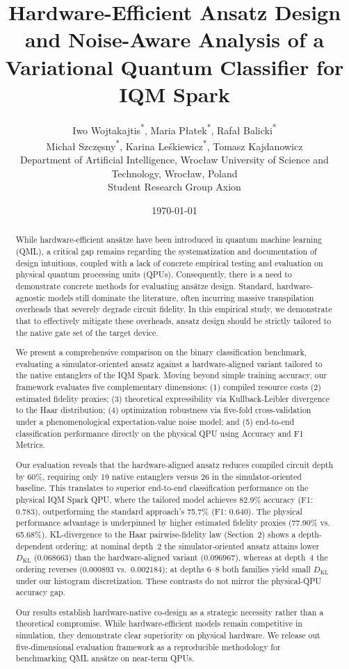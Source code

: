 \documentclass[11pt]{article}
\title{Hardware-Efficient Ansatz Design and Noise-Aware Analysis of a Variational Quantum Classifier for IQM Spark}
\author{
\begin{tabular}{c}
Iwo Wojtakajtis\textsuperscript{*}, Maria P{\l}atek\textsuperscript{*}, Rafa{\l} Balicki\textsuperscript{*}\\
Micha{\l} Szcz{\k{e}}sny\textsuperscript{*}, Karina Le{\'s}kiewicz\textsuperscript{*}, Tomasz Kajdanowicz\\[0.5em]
\small Department of Artificial Intelligence, Wroc{\l}aw University of Science and Technology, Wroc{\l}aw, Poland\\
\small Student Research Group Axion
\end{tabular}
}
\date{\today}
\begin{document}
\maketitle

\begin{abstract}
While hardware-efficient ansätze have been introduced in quantum machine learning (QML), a critical gap remains regarding the systematization and documentation of design intuitions, coupled with a lack of concrete empirical testing and evaluation on physical quantum processing units (QPUs). Consequently, there is a need to demonstrate concrete methods for evaluating  ansätze design. Standard, hardware-agnostic models still dominate the literature, often incurring massive transpilation overheads that severely degrade circuit fidelity. In this empirical study, we demonstrate that to effectively mitigate these overheads, ansatz design should be strictly tailored to the native gate set of the target device.

We present a comprehensive comparison on the binary classification benchmark, evaluating a simulator-oriented ansatz against a hardware-aligned variant tailored to the native entanglers of the IQM Spark. Moving beyond simple training accuracy, our framework evaluates five complementary dimensions: (1) compiled resource costs (2) estimated fidelity proxies; (3) theoretical expressibility via Kullback-Leibler divergence to the Haar distribution; (4) optimization robustness via five-fold cross-validation under a phenomenological expectation-value noise model; and (5) end-to-end classification performance directly on the physical QPU using Accuracy and F1 Metrics. 

Our evaluation reveals that the hardware-aligned ansatz reduces compiled circuit depth by 60\%, requiring only 19 native entanglers versus 26 in the simulator-oriented baseline. This translates to superior end-to-end classification performance on the physical IQM Spark QPU, where the tailored model achieves 82.9\% accuracy (F1: 0.783), outperforming the standard approach's 75.7\% (F1: 0.640). The physical performance advantage is underpinned by higher estimated fidelity proxies (77.90\% vs. 65.68\%). KL-divergence to the Haar pairwise-fidelity law (Section~2) shows a depth-dependent ordering: at nominal depth~2 the simulator-oriented ansatz attains lower $D_{\mathrm{KL}}$ ($0.068663$) than the hardware-aligned variant ($0.096967$), whereas at depth~4 the ordering reverses ($0.000893$ vs.\ $0.002184$); at depths $6$--$8$ both families yield small $D_{\mathrm{KL}}$ under our histogram discretization. These contrasts do not mirror the physical-QPU accuracy gap.

Our results establish hardware-native co-design as a strategic necessity rather than a theoretical compromise. While hardware-efficient models remain competitive in simulation, they demonstrate clear superiority on physical hardware. We release out five-dimensional evaluation framework as a reproducible methodology for benchmarking QML ansätze on near-term QPUs.

\end{abstract}
\end{document}
